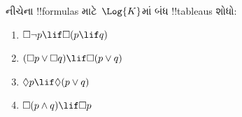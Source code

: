 \documentclass[../../../include/open-logic-section]{subfiles}
\begin{document}
\begin{prob}
  નીચેના !!{formula}s માટે~$\Log{K}$માં બંધ !!{tableau}s શોધો:
  \begin{enumerate}
    \item $\Box \lnot p \lif \Box(p \lif q)$
    \item $(\Box p \lor \Box q) \lif \Box(p \lor q)$
    \item $\Diamond p \lif \Diamond(p \lor q)$
    \item $\Box(p \land q) \lif \Box p$
  \end{enumerate}
\end{prob}
\end{document}
